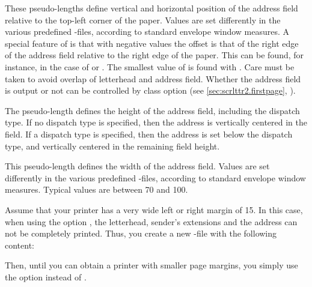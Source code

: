 \begin{Declaration}
\end{Declaration}
These pseudo-lengths define vertical and horizontal position of the address
field relative to the top-left corner of the paper. Values are set differently
in the various predefined
-files,
according to standard envelope window measures. A special feature of
 is that with negative values the offset is that of the
right edge of the address field relative to the right edge of the paper. This
can be found, for instance, in the case of  or . The
smallest value of  is found with . Care
must be taken to avoid overlap of letterhead and address field. Whether the
address field is output or not can be controlled by class option
 (see \autoref{sec:scrlttr2.firstpage},
).%
%
\EndIndexGroup


\begin{Declaration}
\end{Declaration}
The pseudo-length  defines the height of the
address field, including the dispatch type. If no dispatch type is
specified, then the address is vertically centered in the field. If a
dispatch type is specified, then the address is set below the dispatch
type, and vertically centered in the remaining field height.
%
\EndIndexGroup
 

\begin{Declaration}
\end{Declaration}
This pseudo-length defines the width of the address field. Values are set
differently in the various predefined
-files,
according to standard envelope window measures. Typical values are between
70 and 100.
\begin{Example}
  Assume that your printer has a very wide left or right margin of
  15. In this case, when using the option , the
  letterhead, sender's extensions and the address can not be completely
  printed. Thus, you create a new -file with the following content:
  Then, until you can obtain a printer with smaller page margins, you
  simply use the option  instead of .
\end{Example}
%
\EndIndexGroup


